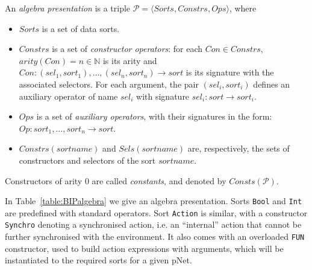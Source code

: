 \documentclass[smallcondensed]{svjour3}
\newcommand{\noteSB}[2][color=green!40, size=\tiny]{\todo[#1]{{\bf Simon: } {#2}}}
\newcommand{\mdash}{---}
\begin{document}
\def\APres{\mathcal{P}}
\begin{definition}
	An \emph{algebra presentation} is a triple $\APres=\langle\mathit{Sorts},\mathit{Constrs},\mathit{Ops}\rangle$, where
	
	\begin{itemize}
		\item $Sorts$ is a set of data sorts.
		\item $\mathit{Constrs}$ is a set of \emph{constructor operators}: for each $\mathit{Con} \in \mathit{Constrs}$, $arity(Con)=n \in \mathbb{N}$ is its arity 
		and $Con : (\mathit{sel}_1,\mathit{sort}_1), \dots, (\mathit{sel}_n,\mathit{sort}_n) \rightarrow \mathit{sort}$ is its signature with the associated selectors.
		For each argument, the pair $(\mathit{sel}_i,\mathit{sort}_i)$ defines an auxiliary
		operator of name $\mathit{sel}_i$ with signature $\mathit{sel}_i : \mathit{sort} \rightarrow \mathit{sort}_i$.
		\item $Ops$ is a set of \emph{auxiliary operators}, with their
		signatures in the form: \\ $Op : \mathit{sort}_1, \dots,  \mathit{sort}_n \rightarrow
		\mathit{sort}$.
		\item $\mathit{Constrs}(\mathit{sortname})$ and $\mathit{Sels}(\mathit{sortname})$ are, respectively, the sets of
		constructors and selectors of the sort $\mathit{sortname}$.
	\end{itemize}
	Constructors of arity 0 are called \emph{constants}, and denoted by $\mathit{Consts}(\APres)$.
\end{definition}

In Table~\ref{table:BIPalgebra} we give an algebra presentation.
Sorts \texttt{Bool} and \texttt{Int} are predefined with standard operators.
Sort \texttt{Action} is similar, with a constructor \texttt{Synchro} denoting
a synchronised action, i.e. an ``internal'' action that cannot be
further synchronised with the environment. It also comes with an
overloaded \texttt{FUN} constructor, used to build action expressions with
arguments, which will be instantiated to the required sorts for a given
pNet.
\end{document}

